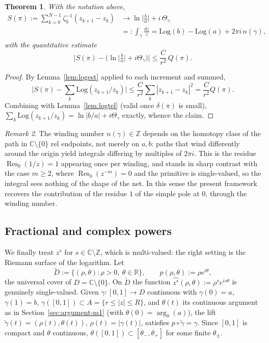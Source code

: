 \documentclass[11pt,fleqn]{article}
\def\C{\mathbb C}
\def\R{\mathbb R}
\def\Z{\mathbb Z}
\theoremstyle{plain}
\newtheorem{thm}{Theorem}[section]
\theoremstyle{remark}
\newtheorem{remark}[thm]{Remark}
\begin{document}
\begin{thm}\label{thm:logwinding}
With the notation above,
\begin{align*}
S(\pi):=\sum_{k=0}^{N-1}\zeta_k^{-1}(z_{k+1}-z_k)&\longrightarrow
\ln\Big|\frac ba\Big|+i\,\Theta_\gamma\\
&=:\int_\gamma\frac{dz}z=\mathrm{Log}(b)-\mathrm{Log}(a)+2\pi i\,n(\gamma),
\end{align*}
with the quantitative estimate
\[
\Big|S(\pi)-\Big(\ln\big|\tfrac ba\big|+i\Theta_\gamma\Big)\Big|
\le\frac C{r^2}\,Q(\pi).
\]
\end{thm}
\begin{proof}
By Lemma~\ref{lem:logest} applied to each increment and summed,
\[
\Big|S(\pi)-\sum_k\mathrm{Log}(z_{k+1}/z_k)\Big|
\le\frac C{r^2}\sum_k|z_{k+1}-z_k|^2=\frac C{r^2}Q(\pi).
\]
Combining with Lemma~\ref{lem:logtel} (valid once $\delta(\pi)$ is small),
$\sum_k\mathrm{Log}(z_{k+1}/z_k)=\ln|b/a|+i\Theta_\gamma$ exactly, whence
the claim. \qedhere
\end{proof}

\begin{remark}
The winding number $n(\gamma)\in\Z$ depends on the homotopy class of the
path in $\C\setminus\{0\}$ rel endpoints, not merely on $a,b$: paths that
wind differently around the origin yield integrals differing by
multiples of $2\pi i$. This is the residue $\operatorname{Res}_0(1/z)=1$
appearing once per winding, and stands in sharp contrast with the case
$m\ge2$, where $\operatorname{Res}_0(z^{-m})=0$ and the primitive is
single-valued, so the integral sees nothing of the shape of the net. In
this sense the present framework recovers the contribution of the
residue $1$ of the simple pole at $0$, through the winding number.
\end{remark}

\subsection{Fractional and complex powers}

We finally treat $z^s$ for $s\in\C\setminus\Z$, which is multi-valued: the
right setting is the Riemann surface of the logarithm. Let
\[
\widetilde D:=\{(\rho,\theta):\rho>0,\ \theta\in\R\},\qquad
p(\rho,\theta):=\rho e^{i\theta},
\]
the universal cover of $D=\C\setminus\{0\}$. On $\widetilde D$ the function
$\widehat{z^s}(\rho,\theta):=\rho^se^{is\theta}$ is genuinely
single-valued. Given $\gamma\colon[0,1]\to D$ continuous with
$\gamma(0)=a$, $\gamma(1)=b$, $\gamma([0,1])\subset A=\{r\le|z|\le R\}$,
and $\theta(t)$ its continuous argument as in Section~\ref{sec:argument-m1} (with
$\theta(0)=\arg_0(a)$), the lift $\widetilde\gamma(t)=(\rho(t),\theta(t))$,
$\rho(t)=|\gamma(t)|$, satisfies $p\circ\widetilde\gamma=\gamma$. Since
$[0,1]$ is compact and $\theta$ continuous, $\theta([0,1])\subset
[\theta_-,\theta_+]$ for some finite $\theta_\pm$.
\end{document}
